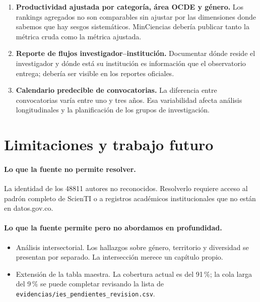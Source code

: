 \documentclass[11pt,a4paper,oneside]{article}
\begin{document}
\begin{enumerate}[label=D.\arabic*., leftmargin=*]
\item \textbf{Productividad ajustada por categoría, área OCDE y género.} Los rankings agregados no son comparables sin ajustar por las dimensiones donde sabemos que hay sesgos sistemáticos. MinCiencias debería publicar tanto la métrica cruda como la métrica ajustada.
\item \textbf{Reporte de flujos investigador--institución.} Documentar dónde reside el investigador y dónde está su institución es información que el observatorio entrega; debería ser visible en los reportes oficiales.
\item \textbf{Calendario predecible de convocatorias.} La diferencia entre convocatorias varía entre uno y tres años. Esa variabilidad afecta análisis longitudinales y la planificación de los grupos de investigación.
\end{enumerate}

\section{Limitaciones y trabajo futuro}\label{sec:limitaciones}

\paragraph{Lo que la fuente no permite resolver.}
La identidad de los \num{48811} autores no reconocidos. Resolverlo requiere acceso al padrón completo de ScienTI o a registros académicos institucionales que no están en datos.gov.co.

\paragraph{Lo que la fuente permite pero no abordamos en profundidad.}
\begin{itemize}
\item Análisis intersectorial. Los hallazgos sobre género, territorio y diversidad se presentan por separado. La intersección merece un capítulo propio.
\item Extensión de la tabla maestra. La cobertura actual es del 91\,\%; la cola larga del 9\,\% se puede completar revisando la lista de \texttt{evidencias/ies\_pendientes\_revision.csv}.
\end{itemize}
\end{document}
